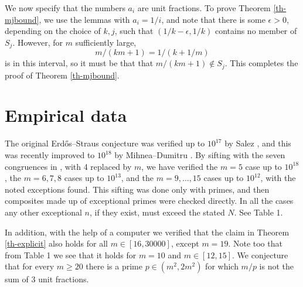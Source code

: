\documentclass[12pt]{amsart}
\theoremstyle{definition}
\theoremstyle{remark}
\numberwithin{equation}{section}
\begin{document}
We now specify that the numbers $a_i$ are unit fractions.
To prove Theorem \ref{th-mjbound}, we use the lemmas with $a_i=1/i$, and note that there is some $\epsilon>0$,
depending on the choice of $k,j$, such that
$(1/k-\epsilon,1/k)$ contains no member of $S_j$.  However, for $m$ sufficiently large,
\[
m/(km+1)=1/(k+1/m)
\]
is in this interval, so it must be that that $m/(km+1)\notin S_j$.
This completes the proof of Theorem \ref{th-mjbound}.


\section{Empirical data}

The original Erd\H os--Straus conjecture was verified up to $10^{17}$ by 
Salez \cite{S}, and this was recently improved to $10^{18} $ by Mihnea--Dumitru \cite{MD}.
By sifting with the seven congruences in \cite[Proposition 1.9]{ET}, 
with 4 replaced by $m$,
we have verified the $m=5$ case up to $10^{18}$, the $m=6, 7, 8$ cases up to $10^{13}$,
and the $m=9,\dots,15$ cases up to $10^{12}$, with the noted exceptions found.
This sifting was done only with primes, and then composites made up of exceptional primes
were checked directly.
In all the cases any other exceptional $n$, if they exist, must exceed the stated $N$.
See Table 1.

In addition, with the help of a computer we verified that the claim in Theorem \ref{th-explicit} also holds for all $m \in [16,30000]$, except $m=19$.  Note too that from Table 1 we see that it holds for
$m=10$ and $m\in[12,15]$.  We conjecture that for every $m\ge20$ there is a prime
$p\in(m^2,2m^2)$ for which $m/p$ is not the sum of 3 unit fractions.
\end{document}
